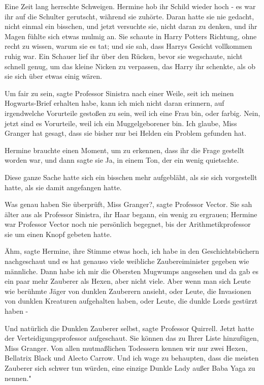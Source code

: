 Eine Zeit lang herrschte Schweigen. Hermine hob ihr Schild wieder hoch - es war
ihr auf die Schulter gerutscht, während sie zuhörte. Daran hatte sie nie
gedacht, nicht einmal ein bisschen, und jetzt versuchte sie, nicht daran zu
denken, und ihr Magen fühlte sich etwas mulmig an. Sie schaute in Harry Potters
Richtung, ohne recht zu wissen, warum sie es tat; und sie sah, dass Harrys
Gesicht vollkommen ruhig war. Ein Schauer lief ihr über den Rücken, bevor sie
wegschaute, nicht schnell genug, um das kleine Nicken zu verpassen, das Harry
ihr schenkte, als ob sie sich über etwas einig wären.

\glqq Um fair zu sein\grqq{}, sagte Professor Sinistra nach einer Weile, \glqq
seit ich meinen Hogwarts-Brief erhalten habe, kann ich mich nicht daran
erinnern, auf irgendwelche Vorurteile gestoßen zu sein, weil ich eine Frau bin,
oder farbig. Nein, jetzt sind es Vorurteile, weil ich ein Muggelgeborener bin.
Ich glaube, Miss Granger hat gesagt, dass sie bisher nur bei Helden ein Problem
gefunden hat.\grqq{}

Hermine brauchte einen Moment, um zu erkennen, dass ihr die Frage gestellt
worden war, und dann sagte sie \glqq Ja\grqq{}, in einem Ton, der ein wenig
quietschte.

Diese ganze Sache hatte sich ein bisschen mehr aufgebläht, als sie sich
vorgestellt hatte, als sie damit angefangen hatte.

\glqq Was genau haben Sie überprüft, Miss Granger?\grqq{}, sagte Professor
Vector. Sie sah älter aus als Professor Sinistra, ihr Haar begann, ein wenig zu
ergrauen; Hermine war Professor Vector noch nie persönlich begegnet, bis der
Arithmetikprofessor sie um einen Knopf gebeten hatte.

\glqq Ähm\grqq{}, sagte Hermine, ihre Stimme etwas hoch, \glqq ich habe in den
Geschichtsbüchern nachgeschaut und es hat genauso viele weibliche
Zaubereiminister gegeben wie männliche. Dann habe ich mir die Obersten Mugwumps
angesehen und da gab es ein paar mehr Zauberer als Hexen, aber nicht viele. Aber
wenn man sich Leute wie berühmte Jäger von dunklen Zauberern ansieht, oder
Leute, die Invasionen von dunklen Kreaturen aufgehalten haben, oder Leute, die
dunkle Lords gestürzt haben -\grqq{}

\glqq Und natürlich die Dunklen Zauberer selbst\grqq{}, sagte Professor
Quirrell. Jetzt hatte der Verteidigungsprofessor aufgeschaut. \glqq Sie können
das zu Ihrer Liste hinzufügen, Miss Granger. Von allen mutmaßlichen Todessern
kennen wir nur zwei Hexen, Bellatrix Black und Alecto Carrow. Und ich wage zu
behaupten, dass die meisten Zauberer sich schwer tun würden, eine einzige Dunkle
Lady außer Baba Yaga zu nennen."

